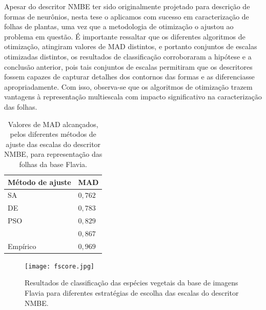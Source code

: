 Apesar do descritor \gls{NMBE} ter sido originalmente projetado para descrição de formas de neurônios, nesta tese o aplicamos com sucesso em caracterização de folhas de plantas, uma vez que a metodologia de otimização o ajustou ao problema em questão.
É importante ressaltar que os diferentes algoritmos de otimização, atingiram valores de \gls{MAD} distintos, e portanto conjuntos de escalas otimizadas distintos, os resultados de classificação corroboraram a hipótese e a conclusão anterior, pois tais conjuntos de escalas  permitiram que os descritores fossem capazes de capturar detalhes dos contornos das formas e as diferenciasse apropriadamente. Com isso, observa-se que os algoritmos de otimização trazem vantagens à representação multiescala com impacto significativo na caracterização das folhas. 

\begin{table}[]
	\centering
	\caption{Valores de MAD alcançados, pelos diferentes métodos de ajuste das escalas do descritor NMBE, para representação das folhas da base Flavia.}
	\label{tab:leaves_supervised_results}
	\begin{tabular}{ll}
		\toprule[1.5pt]
		Método de ajuste& \gls{MAD}\\
		\midrule
		\gls{SA}  & $0,762$\\
		\gls{DE}  & $0,783$\\
		\gls{PSO}&  $0,829$\\
		\citeonline{Costa:1997}& $0,867$\\
		Empírico& $0,969$\\
		\bottomrule[1.5pt]
	\end{tabular}
\end{table}

\begin{figure}[!htb]
	\caption{\label{fig:leaves_fscore} Resultados de classificação das espécies vegetais da base de imagens Flavia para diferentes estratégias de escolha das escalas do descritor NMBE.}
	\centering
	\texttt{[image: fscore.jpg]}
\end{figure}



